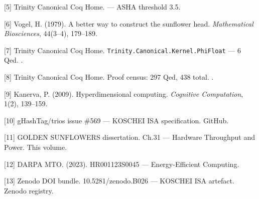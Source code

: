 [5] Trinity Canonical Coq Home.
--- ASHA threshold 3.5.

[6] Vogel, H. (1979). A better way to
construct the sunflower head. \emph{Mathematical
Biosciences}, 44(3--4), 179--189.

[7] Trinity Canonical Coq Home.
\texttt{Trinity.Canonical.Kernel.PhiFloat} --- 6
Qed. .

[8] Trinity Canonical Coq Home. Proof census:
297 Qed, 438 total.
.

[9] Kanerva, P. (2009). Hyperdimensional
computing. \emph{Cognitive Computation}, 1(2),
139--159.

[10] gHashTag/trios issue \#569 --- KOSCHEI
ISA specification. GitHub.

[11] GOLDEN SUNFLOWERS dissertation. Ch.31 ---
Hardware Throughput and Power. This volume.

[12] DARPA MTO. (2023). HR001123S0045 ---
Energy-Efficient Computing.

[13] Zenodo DOI bundle. 10.5281/zenodo.B026
--- KOSCHEI ISA artefact. Zenodo registry.


